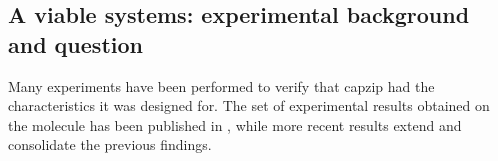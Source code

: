 \subsection{A viable systems: experimental background and question}
Many experiments have been performed to verify that capzip had the characteristics it was designed for. The set of experimental results obtained on the molecule has been published in \citet{Castelletto2016}, while more recent results extend and consolidate the previous findings.

\begin{figure}
\begin{center}
 \hspace{0.3cm}

\end{center}
\end{figure}
